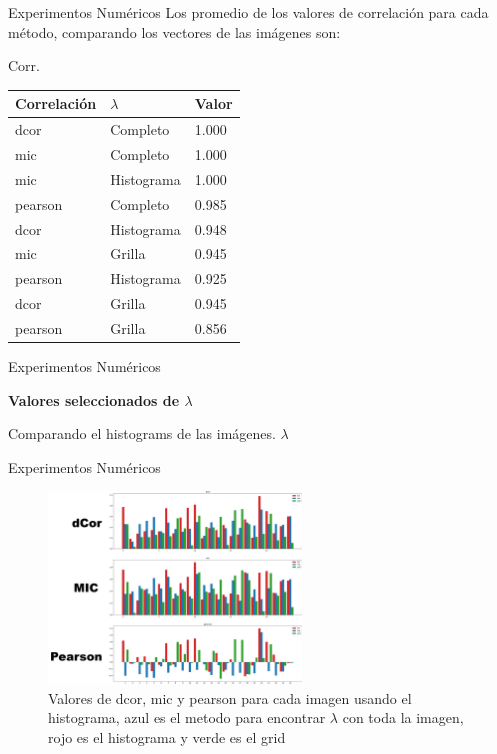 \documentclass{beamer}
\begin{document}
\begin{frame}{Experimentos Numéricos}
    Los promedio de los valores de correlación para cada método, comparando los vectores de las imágenes son:
    \pause
    \begin{block}{Corr.} 
        \begin{table}[H]
            \centering
            \begin{tabular}{|l|l|l|}
                \hline
            Correlaci\'on    & $\lambda$ & Valor  \\    \hline
            dcor    & Completo    & 1.000  \\
            mic     & Completo    & 1.000  \\
            mic     & Histograma  & 1.000  \\
            pearson & Completo    & 0.985 \\
            dcor    & Histograma  & 0.948 \\
            mic     & Grilla      & 0.945  \\
            pearson & Histograma  & 0.925  \\
            dcor    & Grilla      & 0.945  \\
            pearson & Grilla      & 0.856  \\     \hline
            \end{tabular}
        \end{table}
    \end{block}
\end{frame}
\begin{frame}{Experimentos Numéricos}
    \begin{center}
        {\LARGE\bf Valores seleccionados de $\lambda$}
    \end{center}
    \pause
    \begin{center}
        {\Large  Comparando el histograms de las imágenes. $\lambda$}
    \end{center}
\end{frame}

\begin{frame}{Experimentos Numéricos}
    \begin{figure}[H]
        \centering
        \includegraphics[width=0.6\textwidth]{plot_comparison_hist.png}
        \caption{Valores de dcor, mic y pearson para cada imagen usando el histograma, azul es el metodo para encontrar $\lambda$ con toda la imagen, rojo es el histograma y verde es el grid}
    \end{figure}
\end{frame}
\end{document}
